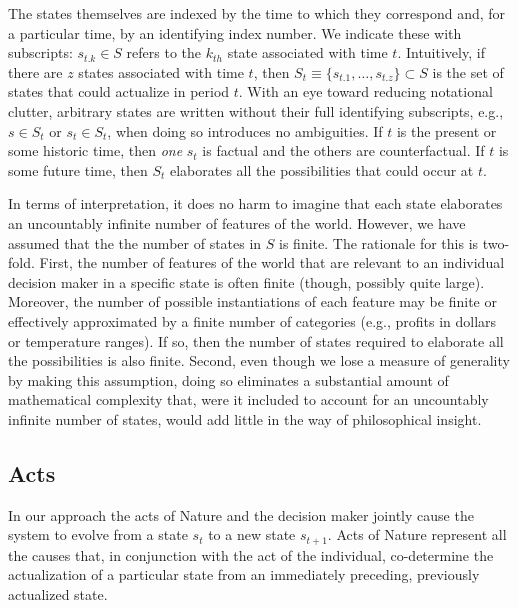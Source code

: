 \documentclass[
11pt,
titlepage,
reqno,
]{article}%
\theoremstyle{definition}
\begin{document}
The states themselves are indexed by the time to which they correspond and, for a particular time, by an identifying index number.
We indicate these with subscripts: $s_{t.k}\in S$ refers to the $k_{th}$ state associated with time $t$.
Intuitively, if there are $z$ states associated with time $t$, then $S_t\equiv\{s_{t.1},\dots,s_{t.z}\}\subset S$ is the set of states that could actualize in period $t$.
With an eye toward reducing notational clutter, arbitrary states are written without their full identifying subscripts, e.g., $s\in S_t$ or $s_t\in S_t$, when doing so introduces no ambiguities.
If $t$ is the present or some historic time, then \textit{one}  $s_t$ is factual and the others are counterfactual. 
If $t$ is some future time, then $S_t$ elaborates all the possibilities that could occur at $t$.

In terms of interpretation, it does no harm to imagine that each state elaborates an uncountably infinite number of features of the world.
However,  we have assumed that the the number of states in $S$ is finite.
The rationale for this is two-fold.
First, the number of features of the world that are relevant to an individual decision maker in a specific state is often finite (though, possibly quite large).
Moreover, the number of possible instantiations of each feature may be finite or effectively approximated by a finite number of  categories (e.g., profits in dollars or temperature ranges).
If so, then the number of states required to elaborate all the possibilities is also finite.
Second, even  though we lose a measure of generality by making this assumption, doing so eliminates a substantial amount of mathematical complexity that, were it included to account for an uncountably infinite number of states, would add little in the way of philosophical insight.
	
	
	
\subsection{Acts}\label{sec:acts}
	
In our approach the acts of Nature and the decision maker jointly cause the system to evolve from a state $s_t$ to a new state $s_{t+1}$.
Acts of Nature represent all the causes that, in conjunction with the act of the individual, co-determine the actualization of a particular state from an immediately preceding, previously actualized state.
	
\end{document}
